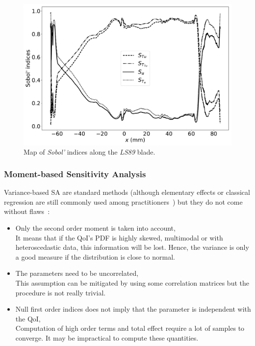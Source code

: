 \begin{figure}[H]
\centering
\includegraphics[width=0.8\linewidth,keepaspectratio]{fig/literature/sobol_map.pdf}
\caption{Map of \emph{Sobol'} indices along the \textit{LS89} blade.}
\label{fig:map_sobol}
\end{figure}

\subsubsection{Moment-based Sensitivity Analysis}
Variance-based SA are standard methods (although elementary effects or classical regression are still commonly used among practitioners~\cite{ferretti2016}) but they do not come without flaws~\cite{borgonovo2016}:

\begin{itemize}
\item Only the second order moment is taken into account,\\
It means that if the QoI's PDF is highly skewed, multimodal or with heteroscedastic data, this information will be lost. Hence, the variance is only a good measure if the distribution is close to normal.
\item The parameters need to be uncorrelated,\\
This assumption can be mitigated by using some correlation matrices but the procedure is not really trivial.
\item Null first order indices does not imply that the parameter is independent with the QoI,\\
Computation of high order terms and total effect require a lot of samples to converge. It may be impractical to compute these quantities.
\end{itemize}

